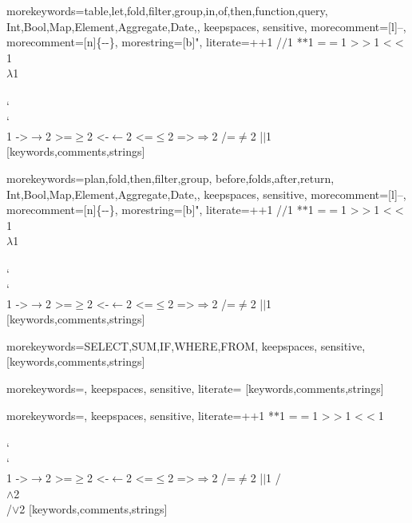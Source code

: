 
%
  {morekeywords={table,let,fold,filter,group,in,of,then,function,query,%
                Int,Bool,Map,Element,Aggregate,Date,},%
   keepspaces,%
   sensitive,%
   morecomment=[l]--,%
   morecomment=[n]{\{-}{-\}},%
   morestring=[b]",%
   literate={+}{{$+$}}1 {/}{{$/$}}1 {*}{{$*$}}1 {=}{{$=$}}1
            {>}{{$>$}}1 {<}{{$<$}}1 {\\}{{$\lambda$}}1
            {\\\\}{{\char`\\\char`\\}}1
            {->}{{$\rightarrow$}}2 {>=}{{$\geq$}}2 {<-}{{$\leftarrow$}}2
            {<=}{{$\leq$}}2 {=>}{{$\Rightarrow$}}2 
            {/=}{{$\ne$}}2
            {|}{{$\mid$}}1
  }[keywords,comments,strings]%

%
  {morekeywords={plan,fold,then,filter,group,%
                before,folds,after,return,%
                Int,Bool,Map,Element,Aggregate,Date,},%
   keepspaces,%
   sensitive,%
   morecomment=[l]--,%
   morecomment=[n]{\{-}{-\}},%
   morestring=[b]",%
   literate={+}{{$+$}}1 {/}{{$/$}}1 {*}{{$*$}}1 {=}{{$=$}}1
            {>}{{$>$}}1 {<}{{$<$}}1 {\\}{{$\lambda$}}1
            {\\\\}{{\char`\\\char`\\}}1
            {->}{{$\rightarrow$}}2 {>=}{{$\geq$}}2 {<-}{{$\leftarrow$}}2
            {<=}{{$\leq$}}2 {=>}{{$\Rightarrow$}}2 
            {/=}{{$\ne$}}2
            {|}{{$\mid$}}1
  }[keywords,comments,strings]%

%
  {morekeywords={SELECT,SUM,IF,WHERE,FROM},%
   keepspaces,%
   sensitive,%
  }[keywords,comments,strings]%

%
  {morekeywords={},%
   keepspaces,%
   sensitive,%
   literate=%
  }[keywords,comments,strings]%

%
  {morekeywords={},%
   keepspaces,%
   sensitive,%
   literate={+}{{$+$}}1 {*}{{$*$}}1 {=}{{$=$}}1
            {>}{{$>$}}1 {<}{{$<$}}1
            {\\\\}{{\char`\\\char`\\}}1
            {->}{{$\rightarrow$}}2 {>=}{{$\geq$}}2 {<-}{{$\leftarrow$}}2
            {<=}{{$\leq$}}2 {=>}{{$\Rightarrow$}}2 
            {/=}{{$\ne$}}2
            {|}{{$\mid$}}1
            {/\\}{{$\wedge$}}2
            {\\/}{{$\vee$}}2
  }[keywords,comments,strings]%

